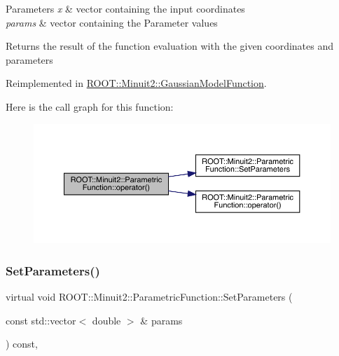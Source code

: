 \begin{DoxyParams}{Parameters}
{\em x} & vector containing the input coordinates\\
\hline
{\em params} & vector containing the Parameter values\\
\hline
\end{DoxyParams}
\begin{DoxyReturn}{Returns}
the result of the function evaluation with the given coordinates and parameters 
\end{DoxyReturn}


Reimplemented in \mbox{\hyperlink{classROOT_1_1Minuit2_1_1GaussianModelFunction_ab74ced8f50ef3831c8142de54877e726}{R\+O\+O\+T\+::\+Minuit2\+::\+Gaussian\+Model\+Function}}.

Here is the call graph for this function\+:
\nopagebreak
\begin{figure}[H]
\begin{center}
\leavevmode
\includegraphics[width=350pt]{d3/d76/classROOT_1_1Minuit2_1_1ParametricFunction_a5fab6e804e0f93bd593580f582b0f7c5_cgraph}
\end{center}
\end{figure}
\mbox{\label{classROOT_1_1Minuit2_1_1ParametricFunction_a63417244db376ec27f2c85ee6432f552}} 
\subsubsection{\texorpdfstring{SetParameters()}{SetParameters()}\hspace{0.1cm}{\footnotesize\ttfamily [1/2]}}
{\footnotesize\ttfamily virtual void R\+O\+O\+T\+::\+Minuit2\+::\+Parametric\+Function\+::\+Set\+Parameters (\begin{DoxyParamCaption}\item[{const std\+::vector$<$ double $>$ \&}]{params }\end{DoxyParamCaption}) const\hspace{0.3cm}{\ttfamily [inline]}, {\ttfamily [virtual]}}

